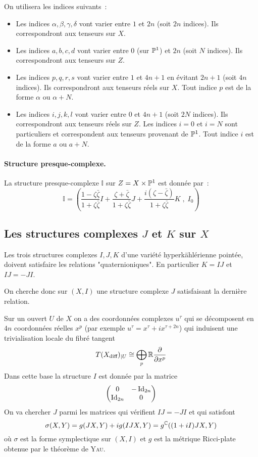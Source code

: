 \documentclass[12pt,draft]{article}
\begin{document}
On utilisera les indices suivants~:
\begin{itemize}
\item Les indices $\alpha,\beta,\gamma,\delta$ vont varier entre $1$ et $2n$ (soit $2n$ indices). Ils correspondront aux tenseurs sur $X$.
\item Les indices $a,b,c,d$ vont varier entre $0$ (sur $\mathbb{P}^1$) et $2n$ (soit $N$ indices). Ils correspondront aux tenseurs sur $Z$.
\item Les indices $p,q,r,s$ vont varier entre $1$ et $4n+1$ en évitant $2n+1$ (soit $4n$ indices). Ils correspondront aux tenseurs réels sur $X$. Tout indice $p$ est de la forme $\alpha$ ou $\alpha+N$.
\item Les indices $i,j,k,l$ vont varier entre $0$ et $4n+1$ (soit $2N$ indices). Ils correspondront aux tenseurs réels sur $Z$. Les indices $i=0$ et $i=N$ sont particuliers et correspondent aux tenseurs provenant de $\mathbb{P}^1$. Tout indice $i$ est de la forme $a$ ou $a+N$.
\end{itemize}

\paragraph*{Structure presque-complexe.}La structure presque-complexe $\mathbb{I}$ sur $Z = X \times \mathbb{P}^1$ est donnée par~:
\[
\mathbb{I} = \left(
\dfrac{1-\zeta \bar{\zeta}}{1+\zeta \bar{\zeta}}I + \dfrac{\zeta + \bar{\zeta}}{1+\zeta \bar{\zeta}}J + \dfrac{i(\zeta - \bar{\zeta})}{1+\zeta \bar{\zeta}}K \; , \; I_0
\right)
\]

\subsection{Les structures complexes $J$ et $K$ sur $X$}
Les trois structures complexes $I,J,K$ d'une variété hyperkählérienne pointée, doivent satisfaire les relations "quaternioniques". En particulier $K = IJ$ et $IJ = -JI$.

On cherche donc sur $(X,I)$ une structure complexe $J$ satisfaisant la dernière relation.

Sur un ouvert $U$ de $X$ on a des coordonnées complexes $u^\tau$ qui se décomposent en $4n$ coordonnées réelles $x^p$ (par exemple $u^\tau = x^\tau + i x^{\tau+2n}$) qui induisent une trivialisation locale du fibré tangent \[
T(X_\text{diff})_{\vert U} \cong \bigoplus_p \mathbb{R} \dfrac{\partial{}}{\partial{x^p}}
\]
Dans cette base la structure $I$ est donnée par la matrice
\[
\begin{pmatrix}
0 & -\operatorname{Id}_{2n} \\ 
\operatorname{Id}_{2n} & 0
\end{pmatrix} 
\]
On va chercher $J$ parmi les matrices qui vérifient $IJ=-JI$ et qui satisfont
\begin{equation}\label{symplecticJ}
\sigma(X,Y) = g(JX,Y) + ig(IJX,Y) = g^{\mathbb{C}}((1+iI)JX,Y)
\end{equation}
où $\sigma$ est la forme symplectique sur $(X,I)$ et $g$ est la métrique Ricci-plate obtenue par le théorème de \textsc{Yau}.
\end{document}
